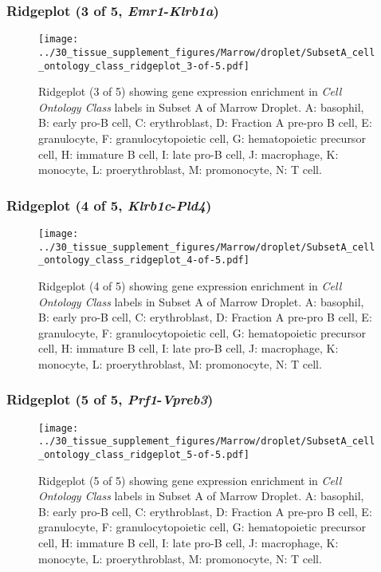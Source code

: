 \clearpage

\subsubsection{Ridgeplot (3 of 5, \emph{Emr1}-\emph{Klrb1a})}
\begin{figure}[h]
\centering
\texttt{[image: ../30\_tissue\_supplement\_figures/Marrow/droplet/SubsetA\_cell\_ontology\_class\_ridgeplot\_3-of-5.pdf]}

\caption{ Ridgeplot (3 of 5)  showing gene expression enrichment in \emph{Cell Ontology Class} labels in Subset A of Marrow Droplet. A: basophil, B: early pro-B cell, C: erythroblast, D: Fraction A pre-pro B cell, E: granulocyte, F: granulocytopoietic cell, G: hematopoietic precursor cell, H: immature B cell, I: late pro-B cell, J: macrophage, K: monocyte, L: proerythroblast, M: promonocyte, N: T cell.}
\end{figure}


\clearpage

\subsubsection{Ridgeplot (4 of 5, \emph{Klrb1c}-\emph{Pld4})}
\begin{figure}[h]
\centering
\texttt{[image: ../30\_tissue\_supplement\_figures/Marrow/droplet/SubsetA\_cell\_ontology\_class\_ridgeplot\_4-of-5.pdf]}

\caption{ Ridgeplot (4 of 5)  showing gene expression enrichment in \emph{Cell Ontology Class} labels in Subset A of Marrow Droplet. A: basophil, B: early pro-B cell, C: erythroblast, D: Fraction A pre-pro B cell, E: granulocyte, F: granulocytopoietic cell, G: hematopoietic precursor cell, H: immature B cell, I: late pro-B cell, J: macrophage, K: monocyte, L: proerythroblast, M: promonocyte, N: T cell.}
\end{figure}


\clearpage

\subsubsection{Ridgeplot (5 of 5, \emph{Prf1}-\emph{Vpreb3})}
\begin{figure}[h]
\centering
\texttt{[image: ../30\_tissue\_supplement\_figures/Marrow/droplet/SubsetA\_cell\_ontology\_class\_ridgeplot\_5-of-5.pdf]}

\caption{ Ridgeplot (5 of 5)  showing gene expression enrichment in \emph{Cell Ontology Class} labels in Subset A of Marrow Droplet. A: basophil, B: early pro-B cell, C: erythroblast, D: Fraction A pre-pro B cell, E: granulocyte, F: granulocytopoietic cell, G: hematopoietic precursor cell, H: immature B cell, I: late pro-B cell, J: macrophage, K: monocyte, L: proerythroblast, M: promonocyte, N: T cell.}
\end{figure}


